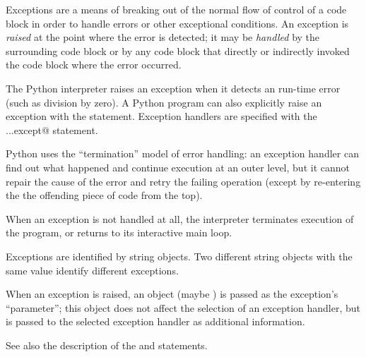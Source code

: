 Exceptions are a means of breaking out of the normal flow of control
of a code block in order to handle errors or other exceptional
conditions.  An exception is {\em raised} at the point where the error
is detected; it may be {\em handled} by the surrounding code block or
by any code block that directly or indirectly invoked the code block
where the error occurred.

The Python interpreter raises an exception when it detects an run-time
error (such as division by zero).  A Python program can also
explicitly raise an exception with the \verb@raise@ statement.
Exception handlers are specified with the \verb@try...except@
statement.

Python uses the ``termination'' model of error handling: an exception
handler can find out what happened and continue execution at an outer
level, but it cannot repair the cause of the error and retry the
failing operation (except by re-entering the the offending piece of
code from the top).

When an exception is not handled at all, the interpreter terminates
execution of the program, or returns to its interactive main loop.

Exceptions are identified by string objects.  Two different string
objects with the same value identify different exceptions.

When an exception is raised, an object (maybe \verb@None@) is passed
as the exception's ``parameter''; this object does not affect the
selection of an exception handler, but is passed to the selected
exception handler as additional information.

See also the description of the \verb@try@ and \verb@raise@
statements.
